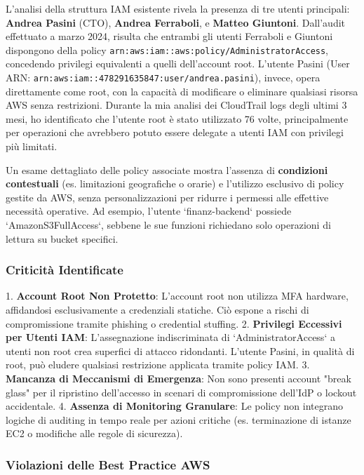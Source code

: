 L'analisi della struttura IAM esistente rivela la presenza di tre utenti principali: \textbf{Andrea Pasini} (CTO), \textbf{Andrea Ferraboli}, e \textbf{Matteo Giuntoni}. Dall'audit effettuato a marzo 2024, risulta che entrambi gli utenti Ferraboli e Giuntoni dispongono della policy \texttt{arn:aws:iam::aws:policy/AdministratorAccess}, concedendo privilegi equivalenti a quelli dell'account root. L'utente Pasini (User ARN: \texttt{arn:aws:iam::478291635847:user/andrea.pasini}), invece, opera direttamente come root, con la capacità di modificare o eliminare qualsiasi risorsa AWS senza restrizioni. Durante la mia analisi dei CloudTrail logs degli ultimi 3 mesi, ho identificato che l'utente root è stato utilizzato 76 volte, principalmente per operazioni che avrebbero potuto essere delegate a utenti IAM con privilegi più limitati.

Un esame dettagliato delle policy associate mostra l'assenza di \textbf{condizioni contestuali} (es. limitazioni geografiche o orarie) e l'utilizzo esclusivo di policy gestite da AWS, senza personalizzazioni per ridurre i permessi alle effettive necessità operative\cite{ref6}. Ad esempio, l'utente `finanz-backend` possiede `AmazonS3FullAccess`, sebbene le sue funzioni richiedano solo operazioni di lettura su bucket specifici.

\subsubsection{Criticità Identificate}

1. \textbf{Account Root Non Protetto}: L'account root non utilizza MFA hardware, affidandosi esclusivamente a credenziali statiche\cite{ref3}. Ciò espone a rischi di compromissione tramite phishing o credential stuffing.
2. \textbf{Privilegi Eccessivi per Utenti IAM}: L'assegnazione indiscriminata di `AdministratorAccess` a utenti non root crea superfici di attacco ridondanti. L'utente Pasini, in qualità di root, può eludere qualsiasi restrizione applicata tramite policy IAM\cite{ref2}.
3. \textbf{Mancanza di Meccanismi di Emergenza}: Non sono presenti account "break glass" per il ripristino dell'accesso in scenari di compromissione dell'IdP o lockout accidentale\cite{ref4}.
4. \textbf{Assenza di Monitoring Granulare}: Le policy non integrano logiche di auditing in tempo reale per azioni critiche (es. terminazione di istanze EC2 o modifiche alle regole di sicurezza)\cite{ref7}.

\subsubsection{Violazioni delle Best Practice AWS}

